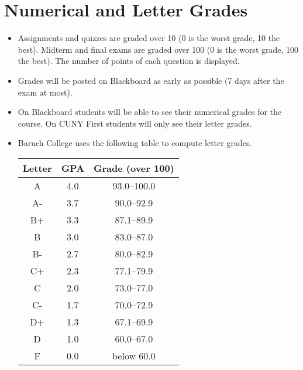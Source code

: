 \documentclass[12]{article}
\begin{document}
\section*{Numerical and Letter Grades}
\begin{itemize}
\item Assignments and quizzes are graded over 10 (0 is the worst grade, 10 the best). Midterm and final exams are graded over 100 (0 is the worst grade, 100 the best). The number of points of each question is displayed.
\item Grades will be posted on Blackboard as early as possible (7 days after the exam at most). 
\item On Blackboard students will be able to see their numerical grades for the course. On CUNY First students will only see their letter grades. 
\item Baruch College uses the following table to compute letter
  grades. 

  \begin{center}
    \begin{tabular}[ht!]{ccc}
      Letter & GPA & Grade (over 100)\\
\hline
A & 4.0 & 93.0--100.0\\
A- & 3.7 & 90.0--92.9\\
B+ & 3.3 & 87.1--89.9\\
B & 3.0 & 83.0--87.0\\
B- & 2.7 & 80.0--82.9\\
C+ & 2.3 & 77.1--79.9\\
C & 2.0 & 73.0--77.0\\
C- & 1.7 & 70.0--72.9\\
D+ & 1.3 & 67.1--69.9\\
D & 1.0 & 60.0--67.0\\
F & 0.0 & below 60.0
    \end{tabular}
  \end{center}
\end{itemize}
\end{document}
